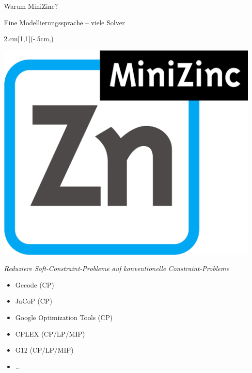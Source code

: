 \documentclass[handout,10pt,xcolor={dvipsnames},fleqn]{beamer}
\begin{document}
\begin{frame}{Warum MiniZinc?}
\begin{parchment}[Rationale]
\centering 
\alert{Eine Modellierungssprache -- viele Solver} 
\end{parchment}

\begin{textblock*}{2.cm}[1,1](\textwidth-.5cm,\textheight-1.03cm)

\includegraphics[width=\textwidth]{img/MiniZn_logo.jpg} 

\end{textblock*}
\emph{Reduziere Soft-Constraint-Probleme auf konventionelle Constraint-Probleme}

\begin{itemize}
\item Gecode (CP)
\item JaCoP (CP)
\item Google Optimization Tools (CP)
\item CPLEX (CP/LP/MIP)
\item G12 (CP/LP/MIP)
\item \ldots
\end{itemize}
\end{frame}
\end{document}
